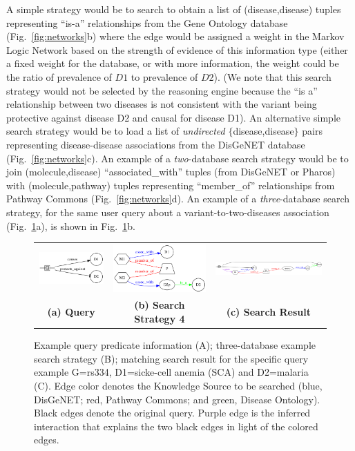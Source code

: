 \documentclass[11pt,notitlepage]{article}
\begin{document}
A simple strategy would be to search to obtain a list of (disease,disease)
tuples representing ``is-a'' relationships from the Gene Ontology database
(Fig.~\ref{fig:networks}b) where the edge would be assigned a weight in the
Markov Logic Network based on the strength of evidence of this information type
(either a fixed weight for the database, or with more information, the weight
could be the ratio of prevalence of $D1$ to prevalence of $D2$). (We note that
this search strategy would not be selected by the reasoning engine because the
``is a'' relationship between two diseases is not consistent with the variant
being protective against disease D2 and causal for disease D1). An alternative
simple search strategy would be to load a list of {\em undirected\/}
$\{$disease,disease$\}$ pairs representing disease-disease associations from the
DisGeNET database (Fig.~\ref{fig:networks}c). An example of a {\em two}-database
search strategy would be to join (molecule,disease) ``associated\_with'' tuples
(from DisGeNET or Pharos) with (molecule,pathway) tuples representing
``member\_of'' relationships from Pathway Commons (Fig.~\ref{fig:networks}d). An
example of a {\em three}-database search strategy, for the same user query about
a variant-to-two-diseases association (Fig.~\ref{fig:threedb}a), is shown in
Fig.~\ref{fig:threedb}b.
\begin{figure}[h!]
  \begin{tabular}{ccc}
  \includegraphics[width=1.4in]{baseproblem.png} &    
  \includegraphics[width=2in]{net4.png} &
  \includegraphics[width=2.5in]{net5.png} \\
                  {\bf (a) Query} & {\bf (b) Search Strategy 4} & {\bf (c) Search Result}
  \end{tabular}
  \caption{Example query predicate information (A); three-database example
    search strategy (B); matching search result for the specific query example
    G=rs334, D1=sicke-cell anemia (SCA) and D2=malaria (C). Edge color denotes
    the Knowledge Source to be searched (blue, DisGeNET; red, Pathway Commons;
    and green, Disease Ontology). Black edges denote the original query. Purple
    edge is the inferred interaction that explains the two black edges in light
    of the colored edges.}
  \label{fig:threedb}
\end{figure}
\end{document}
